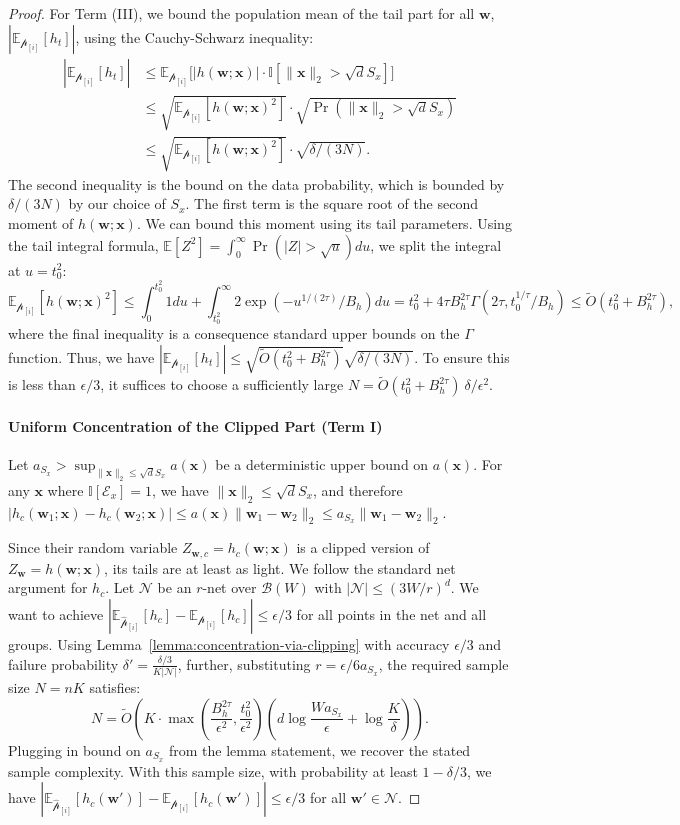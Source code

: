\documentclass[11pt]{article}
\numberwithin{thm}{section}
\theoremstyle{plain}
\theoremstyle{definition}
\theoremstyle{remark} \newtheorem{remark}[thm]{Remark}
\def\vw{{\bm{w}}}
\def\vx{{\bm{x}}}
\def\ep{\widehat{\mathcal{p}}}
\def\pp{{\mathcal{p}}}
\def\cB{{\mathcal{B}}}
\def\cN{{\mathcal{N}}}
\newcommand{\E}{\mathbb{E}}
\newcommand{\ppi}{{\pp_{[i]}}}
\newcommand{\epi}{\ep_{[i]}}
\begin{document}
\begin{proof}
For Term (III), 
we bound the population mean of the tail part for all $\vw$, $|\E_{\ppi}[h_t]|$, 
using the Cauchy-Schwarz inequality:
\begin{align*}
|\E_{\ppi}[h_t]| &\le \E_{\ppi}\bigl[|h(\vw; \vx)| \cdot \mathbb{I}[\|\vx\|_2 > \sqrt{d}S_x]\bigr] \\
&\le \sqrt{\E_{\ppi}[h(\vw; \vx)^2]} \cdot \sqrt{\Pr(\|\vx\|_2 > \sqrt{d}S_x)}\\
&\le \sqrt{\E_{\ppi}[h(\vw; \vx)^2]} \cdot \sqrt{\delta/(3N)}.
\end{align*}
The second inequality is the bound on the data probability, which is bounded by $\delta/(3N)$
by our choice of $S_x$.
The first term is the square root of the second moment of $h(\vw;\vx)$. 
We can bound this moment using its tail parameters. 
Using the tail integral formula, $\E[Z^2] = \int_0^\infty \Pr(|Z|>\sqrt{u})du$, 
we split the integral at $u=t_0^2$:
\[
\E_{\ppi}[h(\vw; \vx)^2] \le \int_0^{t_0^2} 1 du + \int_{t_0^2}^\infty 2\exp(-u^{1/(2\tau)}/B_h) du = t_0^2 + 4\tau B_h^{2\tau} \Gamma(2\tau, t_0^{1/\tau}/B_h) \leq \tilde O(t_0^2 + B_h^{2\tau}), 
\]
where the final inequality is a consequence standard upper bounds on the $\Gamma$ function.
Thus, we have $|\E_{\ppi}[h_t]| \le \sqrt{\tilde O(t_0^2 + B_h^{2\tau})} \sqrt{\delta/(3N)}$. 
To ensure this is less than $\epsilon/3$, 
it suffices to choose a sufficiently large $N = \tilde{O} (t_0^2 + B_h^{2\tau})~\delta / \epsilon^2$. 

\paragraph{Uniform Concentration of the Clipped Part (Term I)}
Let $a_{S_x} > \sup_{\|\vx\|_2 \le \sqrt{d}S_x} a(\vx)$ be a deterministic upper bound on $a(\vx)$.
For any $\vx$ where $\mathbb{I}[\mathcal{E}_x]=1$, 
we have $\|\vx\|_2 \le \sqrt{d}S_x$, 
and therefore $|h_c(\vw_1;\vx) - h_c(\vw_2;\vx)| \le a(\vx)\|\vw_1-\vw_2\|_2 \le a_{S_x}\|\vw_1-\vw_2\|_2$.

Since their random variable 
$Z_{\vw,c} = h_c(\vw;\vx)$ is a clipped version of $Z_\vw=h(\vw;\vx)$, 
its tails are at least as light.
We follow the standard net argument for $h_c$. 
Let $\cN$ be an $r$-net over $\cB(W)$ with $|\cN| \leq (3W/r)^d$. 
We want to achieve $|\E_{\epi}[h_c] - \E_{\ppi}[h_c]| \le \epsilon/3$ for all points in the net and all groups. Using Lemma~\ref{lemma:concentration-via-clipping} with accuracy $\epsilon/3$ and failure probability $\delta' = \frac{\delta/3}{K|\cN|}$, further, substituting $r = \epsilon/6a_{S_x}$, the required sample size $N=nK$ satisfies:
\[
N = \tilde{O}\left( K \cdot \max\left( \frac{B_h^{2\tau}}{\epsilon^2}, \frac{t_0^2}{\epsilon^2} \right) \left(d\log\frac{W a_{S_x}}{\epsilon} + \log\frac{K}{\delta}\right) \right).
\]
Plugging in bound on $a_{S_x}$ from the lemma statement, we recover the stated sample complexity. With this sample size, with probability at least $1-\delta/3$, we have $|\E_{\epi}[h_c(\vw')] - \E_{\ppi}[h_c(\vw')]| \le \epsilon/3$ for all $\vw' \in \cN$.



\end{proof}
\end{document}
